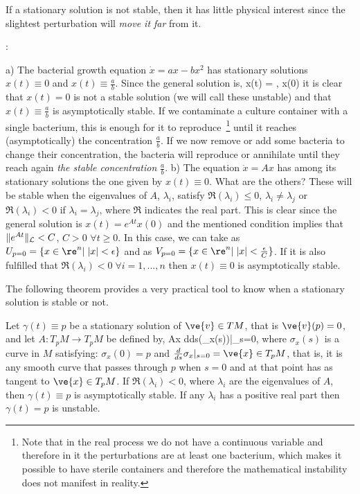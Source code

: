 If a stationary solution is not stable, then it has little physical interest since the slightest perturbation will {\sl move it far} from it.

\espa
\noi{}:

\noi
a) The bacterial growth equation $\dot x = ax -bx^2$ has stationary solutions $x(t) \equiv 0$ and $x(t) \equiv \frac ab$. Since the general solution is, 
\beq
x(t) = , x(0) 
\eeq
it is clear that $x(t)=0$ is not a stable solution (we will call these unstable) and that $x(t) \equiv \frac ab$ is asymptotically stable. If we contaminate a culture container with a single bacterium, this is enough for it to reproduce~\footnote{Note that in the real process we do not have a continuous variable and therefore in it the perturbations are at least one bacterium, which makes it possible to have sterile containers and therefore the mathematical instability does not manifest in reality.} until it reaches (asymptotically) the concentration $\frac ab$. If we now remove or add some bacteria to change their concentration, the bacteria will reproduce or annihilate until they reach again {\sl the stable concentration} $\frac ab$.
\espa
\noi
b) The equation $\dot x = A x$ has among its stationary solutions the one given by $x(t) \equiv 0$. What are the others? These will be stable when the eigenvalues of $A$, $\lambda_i$, satisfy $\Re(\lambda_i) \leq 0$, $\lambda_i \neq \lambda_j$ or $\Re(\lambda_i) <0$ if $\lambda_i=\lambda_j$, where $\Re$ indicates the real part. This is clear since the general solution is $x(t) = e^{At}x(0)$ and the mentioned condition implies that $\|e^{At}\|_{\cal L} < C$, $C >0$ $\forall t\geq 0$. In this case, we can take as $U_{p=0} = \{x \in \re^n |\;|x| < \epsilon\}$ and as $V_{p=0} = \{x \in \re^n |\;|x| < \frac{\epsilon}{C}\}$. If it is also fulfilled that $\Re(\lambda_i) < 0 \;\forall i=1,...,n$ then $x(t) \equiv 0$ is asymptotically stable.

The following theorem provides a very practical tool to know when a stationary solution is stable or not.

\bteo[Stability] 
Let $\gamma(t) \equiv p$ be a stationary solution of $\ve{v} \in TM$, that is $\ve{v}(p) = 0$, and let $A:T_pM\rightarrow T_pM $ be defined by,
\beq
Ax \equiv \frac d{ds}(\sigma_x(s))|_{s=0},
\eeq
where $\sigma_x(s)$ is a curve in $M$ satisfying: $\sigma_x(0)=p$ and $\frac d{ds}\sigma_x|_{s=0} = \ve{x} \in T_pM$, that is, it is any smooth curve that passes through $p$ when $s=0$ and at that point has as tangent to $\ve{x} \in T_pM$. If $\Re (\lambda_i) < 0$, where $\lambda_i$ are the eigenvalues of $A$, then $\gamma(t) \equiv p$ is asymptotically stable. If any $\lambda_i$ has a positive real part then $\gamma(t)=p$ is unstable.
\eteo

